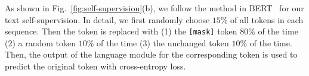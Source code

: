 
As shown in Fig.~\ref{fig:self-supervision}(b), we follow the method in BERT~\citep{devlin2018bert} for our text self-supervision. In detail, we first randomly choose $15\%$ of all tokens in each sequence. Then the token is replaced with (1) the \texttt{[mask]} token $80\%$ of the time (2) a random token $10\%$ of the time (3) the unchanged token $10\%$ of the time. Then, the output of the language module for the corresponding token is used to predict the original token with cross-entropy loss.



